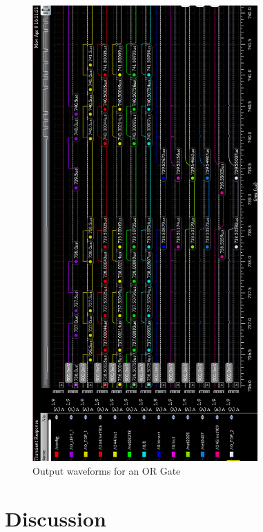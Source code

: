 \begin{figure}[H]
\centering
\includegraphics[width=0.77\textwidth]{Short_OR_Delays.png}
\caption{Output waveforms for an OR Gate}
\label{fig:Figure}
\end{figure}

\section{Discussion}
\paragraph{}

